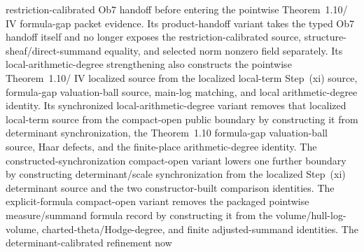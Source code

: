 \begin{proposition}
  restriction-calibrated Ob7 handoff before entering the pointwise
  Theorem~1.10/\IUT{} IV formula-gap packet evidence.
  Its product-handoff variant
  takes the typed Ob7 handoff itself and no longer exposes the
  restriction-calibrated source, structure-sheaf/direct-summand equality, and
  selected norm nonzero field separately.
  Its local-arithmetic-degree strengthening
  also constructs the pointwise Theorem~1.10/\IUT{} IV localized source from
  the localized local-term Step~(xi) source, formula-gap valuation-ball source,
  main-log matching, and local arithmetic-degree identity.
  Its synchronized local-arithmetic-degree variant
  removes that localized local-term source from the compact-open public
  boundary by constructing it from determinant synchronization, the
  Theorem~1.10 formula-gap valuation-ball source, Haar defects, and the
  finite-place arithmetic-degree identity.
  The constructed-synchronization compact-open variant
  lowers one further boundary by constructing determinant/scale
  synchronization from the localized Step~(xi) determinant source and the two
  constructor-built comparison identities.
  The explicit-formula compact-open variant
  removes the packaged pointwise measure/summand formula record by constructing
  it from the volume/hull-log-volume, charted-theta/Hodge-degree, and finite
  adjusted-summand identities.  The determinant-calibrated refinement now

\end{proposition}
